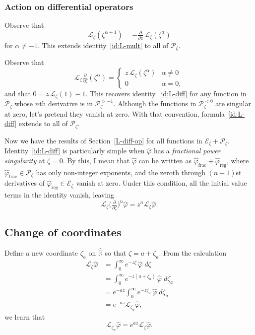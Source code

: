 \documentclass{article}
\newcommand{\R}{\mathbb{R}}
\newcommand{\laplace}{\mathcal{L}}
\begin{document}
\subsubsection{Action on differential operators}\label{L-diff-op-alg}
Observe that
\[ \laplace_\zeta(\zeta^{\alpha + 1}) = -\tfrac{\partial}{\partial z}\,\laplace_\zeta(\zeta^\alpha) \]
for $\alpha \neq -1$. This extends identity~\ref{id:L-mult} to all of $\mathcal{P}_\zeta$.

Observe that
\[ \laplace_\zeta\tfrac{\partial}{\partial \zeta}(\zeta^\alpha) = \begin{cases}
z\,\laplace_\zeta(\zeta^\alpha) & \alpha \neq 0 \\
0 & \alpha = 0,
\end{cases} \]
and that $0 = z\,\laplace_\zeta(1) - 1$. This recovers identity~\ref{id:L-diff} for any function in $\mathcal{P}_\zeta$ whose $n$th derivative is in $\mathcal{P}_\zeta^{> -1}$. Although the functions in $\mathcal{P}_\zeta^{< 0}$ are singular at zero, let's pretend they vanish at zero. With that convention, formula~\ref{id:L-diff} extends to all of $\mathcal{P}_\zeta$.

Now we have the results of Section~\ref{L-diff-op} for all functions in $\mathcal{E}_\zeta + \mathcal{P}_\zeta$. Identity~\ref{id:L-diff} is particularly simple when $\hat{\varphi}$ has a {\em fractional power singularity} at $\zeta = 0$. By this, I mean that $\hat{\varphi}$ can be written as $\hat{\varphi}_\text{frac} + \hat{\varphi}_\text{reg}$, where $\hat{\varphi}_\text{frac} \in \mathcal{P}_\zeta$ has only non-integer exponents, and the zeroth through $(n-1)$st derivatives of $\hat{\varphi}_\text{reg} \in \mathcal{E}_\zeta$ vanish at zero. Under this condition, all the initial value terms in the identity vanish, leaving
\[ \laplace_\zeta \big(\tfrac{\partial}{\partial \zeta}\big)^n \hat{\varphi} = z^n \laplace_\zeta \hat{\varphi}. \]
\subsection{Change of coordinates}
Define a new coordinate $\zeta_a$ on $\hat{\R}$ so that $\zeta = a + \zeta_a$. From the calculation
\begin{align*}
\laplace_\zeta \hat{\varphi} & = \int_0^\infty e^{-z \zeta}\,\hat{\varphi}\;d\zeta \\
& = \int_0^\infty e^{-z(a + \zeta_a)}\,\hat{\varphi}\;d\zeta_a \\
& = e^{-az} \int_0^\infty e^{-z\zeta_a}\,\hat{\varphi}\;d\zeta_a \\
& = e^{-az} \laplace_{\zeta_a} \hat{\varphi},
\end{align*}
we learn that
\[ \laplace_{\zeta_a} \hat{\varphi} = e^{az} \laplace_\zeta \hat{\varphi}. \]
\end{document}

